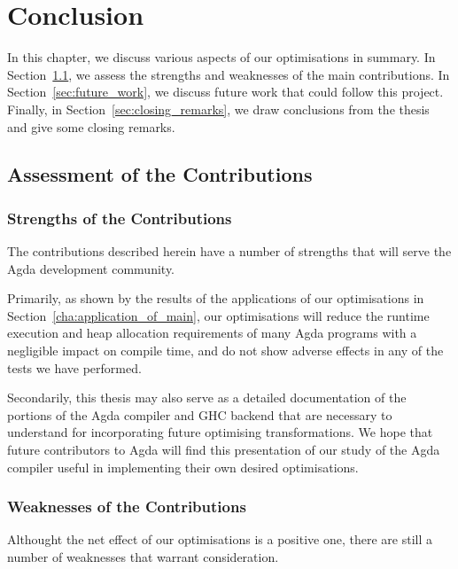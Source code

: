 \chapter{Conclusion}
\label{cha:conclusion}

In this chapter, we discuss various aspects of our optimisations in summary. In Section~\ref{sec:assessment_of_the_contributions}, we assess the strengths and weaknesses of the main contributions. In Section~\ref{sec:future_work}, we discuss future work that could follow this project. Finally, in Section~\ref{sec:closing_remarks}, we draw conclusions from the thesis and give some closing remarks.

\section{Assessment of the Contributions}
\label{sec:assessment_of_the_contributions}

\subsection{Strengths of the Contributions}
\label{sub:strengths_of_the_contributions}

The contributions described herein have a number of strengths that will serve the Agda development community.

Primarily, as shown by the results of the applications of our optimisations in Section~\ref{cha:application_of_main}, our optimisations will reduce the runtime execution and heap allocation requirements of many Agda programs with a negligible impact on compile time, and do not show adverse effects in any of the tests we have performed.

Secondarily, this thesis may also serve as a detailed documentation of the portions of the Agda compiler and GHC backend that are necessary to understand for incorporating future optimising transformations. We hope that future contributors to Agda will find this presentation of our study of the Agda compiler useful in implementing their own desired optimisations.

\subsection{Weaknesses of the Contributions}
\label{sub:weaknesses_of_the_contributions}

Althought the net effect of our optimisations is a positive one, there are still a number of weaknesses that warrant consideration.

